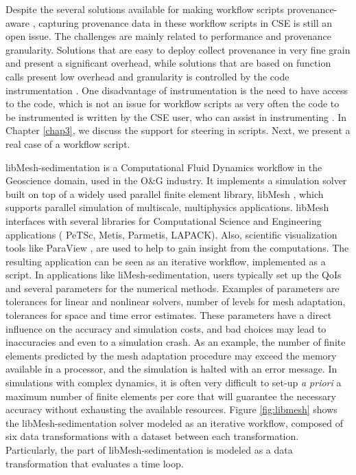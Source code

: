 Despite the several solutions available for making workflow scripts
provenance-aware \cite{Stamatogiannakis2016Trade-Offs,Moreau2018Templating,Pimentel2017noWorkflow:},
capturing provenance data in these workflow scripts in CSE is still an open issue.
The challenges are mainly related to performance and provenance
granularity. Solutions that are easy to deploy collect provenance
in very fine grain and present a significant overhead, while solutions
that are based on function calls present low overhead and granularity is
controlled by the code instrumentation \cite{Stamatogiannakis2016Trade-Offs}.
 One disadvantage of instrumentation is the need to have access to the code, which is not an
issue for workflow scripts as very often the code to be instrumented is written by the CSE user, who can assist in instrumenting
\cite{Silva2018Capturing}. 
In Chapter \ref{chap3}, we discuss the support for steering in scripts.
Next, we present a real case of a workflow script.


\label{sub_libmesh}

libMesh-sedimentation
\cite{Camata2018In}
is a
Computational Fluid Dynamics workflow in the Geoscience domain, used in the O\&G industry. It implements a
simulation solver built on top of a widely used parallel finite element library,
libMesh \cite{Kirk2006libMesh},
which supports parallel simulation of multiscale, multiphysics applications.
libMesh interfaces with several libraries for Computational Science and Engineering applications (\eg{} PeTSc, Metis, Parmetis, LAPACK).
Also, scientific visualization tools like ParaView \cite{Ayachit2015ParaView},
are used to help to gain insight from the computations.
The resulting application can be seen as an iterative workflow, implemented as a script.  
In applications like liMesh-sedimentation, users typically set up
the QoIs and several parameters for the numerical methods. Examples of
parameters are tolerances for linear and nonlinear solvers, number of
levels for mesh adaptation, tolerances for space and time error
estimates. These parameters have a direct influence on the accuracy
and simulation costs, and bad choices may lead to inaccuracies and even
to a simulation crash.
As an example, the number of finite elements
predicted by the mesh adaptation procedure may exceed the memory
available in a processor, and the simulation is halted with an error
message. In simulations with complex dynamics, it is often very
difficult to set-up \textit{a priori} a maximum number of finite elements per
core that will guarantee the necessary accuracy without exhausting the
available resources.
Figure \ref{fig:libmesh} shows the libMesh-sedimentation solver modeled as an iterative workflow, composed of six data transformations with a dataset between each transformation. Particularly, the  part of libMesh-sedimentation is modeled as a data transformation that evaluates a time loop.


